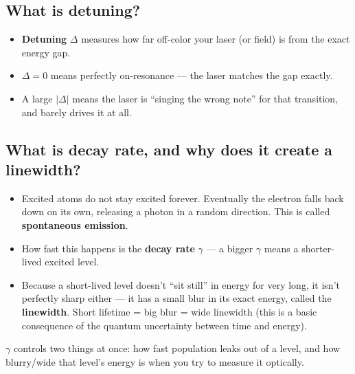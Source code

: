 \documentclass[11pt]{article}
\begin{document}
\subsection*{What is detuning?}
\begin{itemize}
\item \textbf{Detuning} $\Delta$ measures how far off-color your laser (or field) is from the exact energy gap.
\item $\Delta = 0$ means perfectly on-resonance --- the laser matches the gap exactly.
\item A large $|\Delta|$ means the laser is ``singing the wrong note'' for that transition, and barely drives it at all.
\end{itemize}

\subsection*{What is decay rate, and why does it create a linewidth?}
\begin{itemize}
\item Excited atoms do not stay excited forever. Eventually the electron falls back down on its own, releasing a photon in a random direction. This is called \textbf{spontaneous emission}.
\item How fast this happens is the \textbf{decay rate} $\gamma$ --- a bigger $\gamma$ means a shorter-lived excited level.
\item Because a short-lived level doesn't ``sit still'' in energy for very long, it isn't perfectly sharp either --- it has a small blur in its exact energy, called the \textbf{linewidth}. Short lifetime = big blur = wide linewidth (this is a basic consequence of the quantum uncertainty between time and energy).
\end{itemize}
\begin{takeaway}
$\gamma$ controls two things at once: how fast population leaks out of a level, and how blurry/wide that level's energy is when you try to measure it optically.
\end{takeaway}
\end{document}
